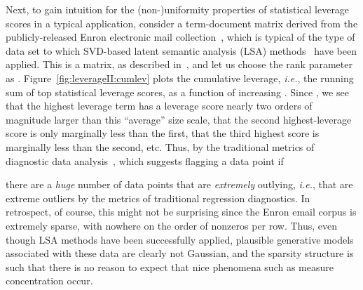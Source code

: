 \documentclass[twoside]{article}
\begin{document}
Next, to gain intuition for the (non-)uniformity properties of statistical 
leverage scores in a typical application, consider a term-document matrix 
derived from the publicly-released 
Enron electronic mail collection~\cite{BB06}, which is typical of the type 
of data set to which SVD-based latent semantic analysis (LSA) 
methods~\cite{DDLFH90} have been applied.
This is a  matrix, as described in~\cite{BB06}, 
and let us choose the rank parameter as .
Figure~\ref{fig:leverageII:cumlev} plots the cumulative leverage, \emph{i.e.}, 
the running sum of top  statistical leverage scores, as a function of 
increasing .
Since , we see that 
the highest leverage term has a leverage score nearly two orders of 
magnitude larger than this ``average'' size scale, that the second 
highest-leverage score is only marginally less than the first, that the 
third highest score is marginally less than the second, etc.
Thus, by the traditional metrics of diagnostic data 
analysis~\cite{VW81,ChatterjeeHadiPrice00}, which suggests flagging a data 
point if 

there are a \emph{huge} number of data points that are \emph{extremely} 
outlying, \emph{i.e.}, that are extreme outliers by the metrics of 
traditional regression diagnostics.
In retrospect, of course, this might not be surprising since the Enron email 
corpus is extremely sparse, with nowhere on the order of  
nonzeros per row.
Thus, even though LSA methods have been successfully applied, plausible 
generative models associated with these data are clearly not Gaussian, and 
the sparsity structure is such that there is no reason to expect that nice 
phenomena such as measure concentration occur.
\end{document}

